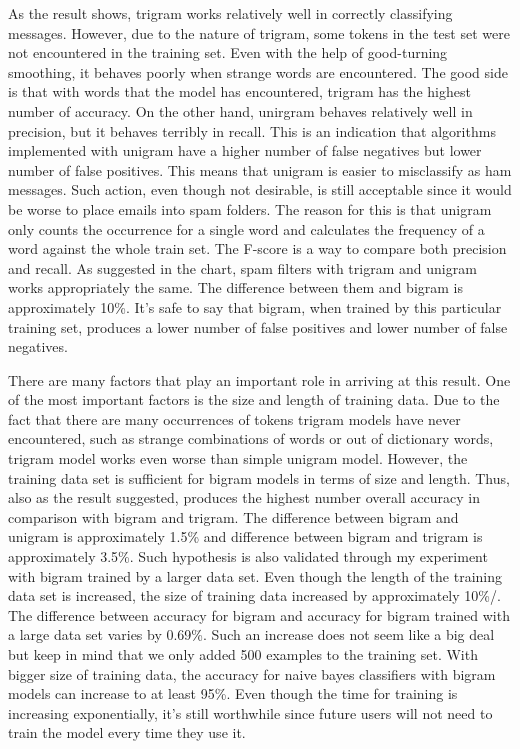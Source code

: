 \documentclass{article}
\begin{document}
As the result shows, trigram works relatively well in correctly classifying messages. However, due to the nature of trigram, some tokens in the test set were not encountered in the training set. Even with the help of good-turning smoothing, it behaves poorly when strange words are encountered. The good side is that with words that the model has encountered, trigram has the highest number of accuracy. On the other hand, unirgram behaves relatively well in precision, but it behaves terribly in recall. This is an indication that algorithms implemented with unigram have a higher number of false negatives but lower number of false positives. This means that unigram is easier to misclassify as ham messages. Such action, even though not desirable, is still acceptable since it would be worse to place emails into spam folders. The reason for this is that unigram only counts the occurrence for a single word and calculates the frequency of a word against the whole train set. 
The F-score is a way to compare both precision and recall. As suggested in the chart, spam filters with trigram and unigram works appropriately the same. The difference between them and bigram is approximately 10\%. It’s safe to say that bigram, when trained by this particular training set, produces a lower number of false positives and lower number of false negatives. 


There are many factors that play an important role in arriving at this result. One of the most important factors is the size and length of training data. Due to the fact that there are many occurrences of tokens trigram models have never encountered, such as strange combinations of words or out of dictionary words, trigram model works even worse than simple unigram model. However, the training data set is sufficient for bigram models in terms of size and length. Thus, also as the result suggested, produces the highest number overall accuracy in comparison with bigram and trigram. The difference between bigram and unigram is approximately 1.5\% and difference between bigram and trigram is approximately 3.5\%. Such hypothesis is also validated through my experiment with bigram trained by a larger data set. Even though the length of the training data set is increased, the size of training data increased by approximately 10\%/. The difference between accuracy for bigram and accuracy for bigram trained with a large data set varies by 0.69\%. Such an increase does not seem like a big deal but keep in mind that we only added 500 examples to the training set. With bigger size of training data, the accuracy for naive bayes classifiers with bigram models can increase to at least 95\%.
Even though the time for training is increasing exponentially, it’s still worthwhile since future users will not need to train the model every time they use it. 
\end{document}
